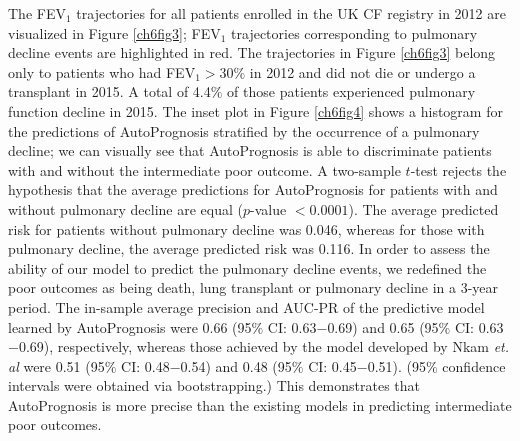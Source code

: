 \documentclass [PhD] {uclathes}
\begin{document}
The FEV$_1$ trajectories for all patients enrolled in the UK CF registry in 2012 are visualized in Figure \ref{ch6fig3}; FEV$_1$ trajectories corresponding to pulmonary decline events are highlighted in red. The trajectories in Figure \ref{ch6fig3} belong only to patients who had FEV$_1>30\%$ in 2012 and did not die or undergo a transplant in 2015. A total of 4.4$\%$ of those patients experienced pulmonary function decline in 2015. The inset plot in Figure \ref{ch6fig4} shows a histogram for the predictions of AutoPrognosis stratified by the occurrence of a pulmonary decline; we can visually see that AutoPrognosis is able to discriminate patients with and without the intermediate poor outcome. A two-sample $t$-test rejects the hypothesis that the average predictions for AutoPrognosis for patients with and without pulmonary decline are equal ($p$-value $< 0.0001$). The average predicted risk for patients without pulmonary decline was 0.046, whereas for those with pulmonary decline, the average predicted risk was 0.116. In order to assess the ability of our model to predict the pulmonary decline events, we redefined the poor outcomes as being death, lung transplant or pulmonary decline in a 3-year period. The in-sample average precision and AUC-PR of the predictive model learned by AutoPrognosis were 0.66 (95$\%$ CI: 0.63$-$0.69) and 0.65 (95$\%$ CI: 0.63$-$0.69), respectively, whereas those achieved by the model developed by Nkam {\it et. al} were 0.51 (95$\%$ CI: 0.48$-$0.54) and 0.48 (95$\%$ CI: 0.45$-$0.51). (95$\%$ confidence intervals were obtained via bootstrapping.) This demonstrates that AutoPrognosis is more precise than the existing models in predicting intermediate poor outcomes. 
\end{document}
